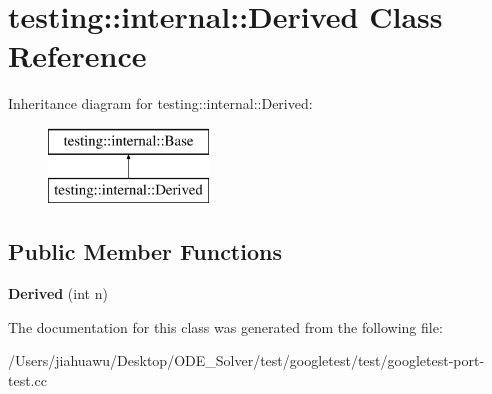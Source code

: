 \hypertarget{classtesting_1_1internal_1_1_derived}{}\section{testing\+:\+:internal\+:\+:Derived Class Reference}
\label{classtesting_1_1internal_1_1_derived}
Inheritance diagram for testing\+:\+:internal\+:\+:Derived\+:\begin{figure}[H]
\begin{center}
\leavevmode
\includegraphics[height=2.000000cm]{classtesting_1_1internal_1_1_derived}
\end{center}
\end{figure}
\subsection*{Public Member Functions}
\begin{DoxyCompactItemize}
\item 
\mbox{\label{classtesting_1_1internal_1_1_derived_a05a8e8354c7c09a9f3728a96c96f1edd}} 
{\bfseries Derived} (int n)
\end{DoxyCompactItemize}


The documentation for this class was generated from the following file\+:\begin{DoxyCompactItemize}
\item 
/\+Users/jiahuawu/\+Desktop/\+O\+D\+E\+\_\+\+Solver/test/googletest/test/googletest-\/port-\/test.\+cc\end{DoxyCompactItemize}
